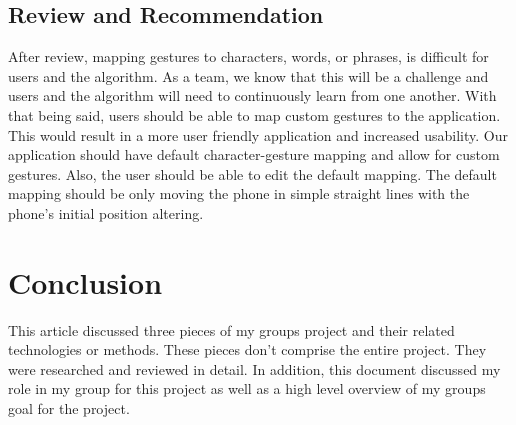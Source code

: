 \documentclass[onecolumn, draftclsnofoot,10pt, journal, letterpaper]{IEEEtran}
\begin{document}
    \subsection{Review and Recommendation}
        After review, mapping gestures to characters, words, or phrases, is difficult for users and the algorithm. As a team, we know that this will be a challenge and users and the algorithm will need to continuously learn from one another. With that being said, users should be able to map custom gestures to the application. This would result in a more user friendly application and increased usability. Our application should have default character-gesture mapping and allow for custom gestures. Also, the user should be able to edit the default mapping. The default mapping should be only moving the phone in simple straight lines with the phone's initial position altering. 
    
\section{Conclusion}
    This article discussed three pieces of my groups project and their related technologies or methods. These pieces don't comprise the entire project. They were researched and reviewed in detail. In addition, this document discussed my role in my group for this project as well as a high level overview of my groups goal for the project. 
    
\newpage
\nocite{*}


\end{document}
